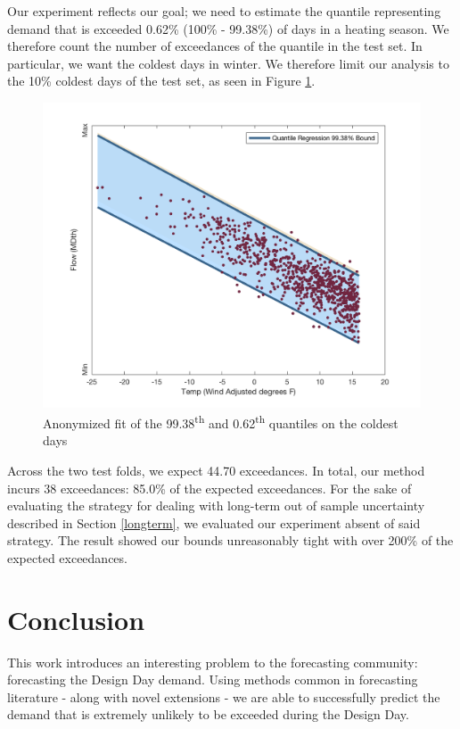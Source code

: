 \documentclass{article}
\begin{document}
Our experiment reflects our goal; we need to estimate the quantile representing demand that is exceeded 0.62\% (100\% - 99.38\%) of days in a heating season. We therefore count the number of exceedances of the quantile in the test set. In particular, we want the coldest days in winter. We therefore limit our analysis to the 10\% coldest days of the test set, as seen in Figure \ref{qrResults}.
\begin{figure}
	\includegraphics[scale=0.3]{bienLab3.png}
	\caption{Anonymized fit of the 99.38\textsuperscript{th} and 0.62\textsuperscript{th} quantiles on the coldest days}\label{qrResults}
\end{figure}
 Across the two test folds, we expect 44.70 exceedances. In total, our method incurs 38 exceedances: 85.0\% of the expected exceedances. For the sake of evaluating the strategy for dealing with long-term out of sample uncertainty described in Section \ref{longterm}, we evaluated our experiment absent of said strategy. The result showed our bounds unreasonably tight with over 200\% of the expected exceedances.

\section{Conclusion}

This work introduces an interesting problem to the forecasting community: forecasting the Design Day demand. Using methods common in forecasting literature - along with novel extensions - we are able to successfully predict the demand that is extremely unlikely to be exceeded during the Design Day. 






\end{document}
